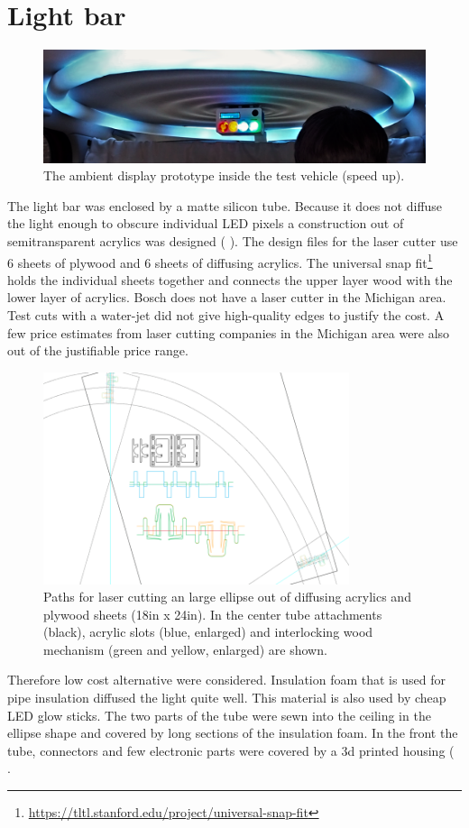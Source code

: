 \section{Light bar}
\begin{figure}
  \includegraphics[width=\textwidth]{fig/teaser.png}
  \caption{The ambient display prototype inside the test vehicle (speed up).}
  \label{fig:ambientdisplay}
\end{figure}
The light bar was enclosed by a matte silicon tube. Because it does not diffuse the light enough to obscure individual LED pixels a construction out of semitransparent acrylics was designed ( ). The design files for the laser cutter use 6 sheets of plywood and 6 sheets of diffusing acrylics. The universal snap fit\footnote{\url{https://tltl.stanford.edu/project/universal-snap-fit}} holds the individual sheets together and connects the upper layer wood with the lower layer of acrylics.  Bosch does not have a laser cutter in the Michigan area. Test cuts with a water-jet did not give high-quality edges to justify the cost. A few price estimates from laser cutting companies in the Michigan area were also out of the justifiable price range. 
\begin{figure}
    \includegraphics[width=0.8\textwidth]{fig/lasercut.png}
    \caption[Paths for Laser Cutting]{Paths for laser cutting an large ellipse out of diffusing acrylics and plywood sheets (18in x 24in). In the center tube attachments (black), acrylic slots (blue,  enlarged) and interlocking wood mechanism (green and yellow, enlarged) are shown.}
    \label{fig:lasercut}
\end{figure}
Therefore low cost alternative were considered. Insulation foam that is used for pipe insulation diffused the light quite well. This material is also used by cheap LED glow sticks. The two parts of the tube were sewn into the ceiling in the ellipse shape and covered by long sections of the insulation foam. 
In the front the tube, connectors and few electronic parts were covered by a 3d printed housing ( . 


